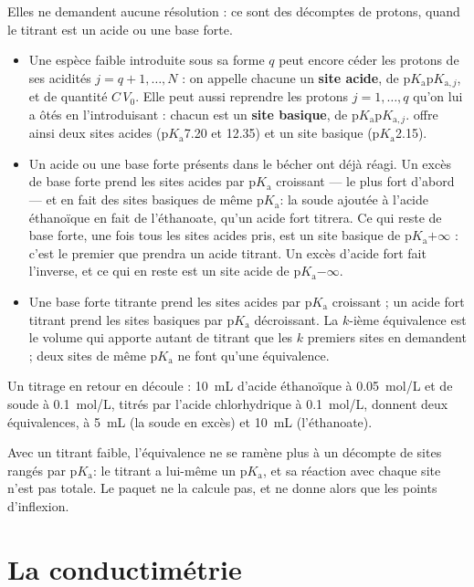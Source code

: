 \documentclass[a4paper,11pt]{article}
\newcommand\logo[1]{\hspace{-12pt}\makebox[12pt][l]{#1}}
\newcommand\rmqcons[1]{\begin{tcolorbox}[rmq, rouge, fontupper=\small\itshape]\logo{\ding{43}}#1\end{tcolorbox}}
\newcommand\gras[1]{\textbf{#1}}
\newcommand\pKa{\ensuremath{\mathrm{p}K_\mathrm{a}}\xspace}
\begin{document}
Elles ne demandent aucune résolution : ce sont des décomptes de protons, quand le titrant est un acide ou une base forte.
\begin{itemize}
\item Une espèce faible introduite sous sa forme $q$ peut encore céder les protons de ses acidités $j=q+1,\dots,N$ : on appelle chacune un \gras{site acide}, de \pKa $\mathrm{p}K_{\mathrm{a},j}$, et de quantité $C\,V_0$.
Elle peut aussi reprendre les protons $j=1,\dots,q$ qu'on lui a ôtés en l'introduisant : chacun est un \gras{site basique}, de \pKa $\mathrm{p}K_{\mathrm{a},j}$.
 offre ainsi deux sites acides (\pKa \num{7,20} et \num{12,35}) et un site basique (\pKa \num{2,15}).
\item Un acide ou une base forte présents dans le bécher ont déjà réagi.
Un excès de base forte prend les sites acides par \pKa croissant — le plus fort d'abord — et en fait des sites basiques de même \pKa : la soude ajoutée à l'acide éthanoïque en fait de l'éthanoate, qu'un acide fort titrera.
Ce qui reste de base forte, une fois tous les sites acides pris, est un site basique de \pKa $+\infty$ : c'est le premier que prendra un acide titrant.
Un excès d'acide fort fait l'inverse, et ce qui en reste est un site acide de \pKa $-\infty$.
\item Une base forte titrante prend les sites acides par \pKa croissant ; un acide fort titrant prend les sites basiques par \pKa décroissant.
La $k$-ième équivalence est le volume qui apporte autant de titrant que les $k$ premiers sites en demandent ; deux sites de même \pKa ne font qu'une équivalence.
\end{itemize}
Un titrage en retour en découle : \qty{10}{mL} d'acide éthanoïque à \qty{0.05}{mol/L} et de soude à \qty{0.1}{mol/L}, titrés par l'acide chlorhydrique à \qty{0.1}{mol/L}, donnent deux équivalences, à \qty{5}{mL} (la soude en excès) et \qty{10}{mL} (l'éthanoate).
\rmqcons{Avec un titrant faible, l'équivalence ne se ramène plus à un décompte de sites rangés par \pKa : le titrant a lui-même un \pKa, et sa réaction avec chaque site n'est pas totale.
Le paquet ne la calcule pas, et ne donne alors que les points d'inflexion.}


\section{La conductimétrie}
\end{document}
